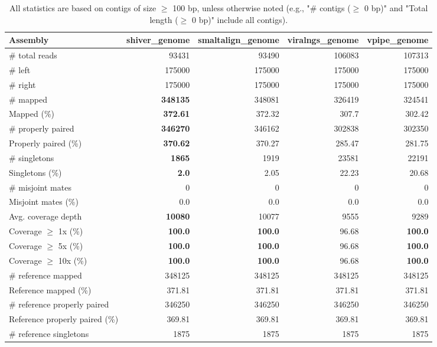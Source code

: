 \documentclass[12pt,a4paper]{article}
\begin{document}
\begin{table}[ht]
\begin{center}
\caption{All statistics are based on contigs of size $\geq$ 100 bp, unless otherwise noted (e.g., "\# contigs ($\geq$ 0 bp)" and "Total length ($\geq$ 0 bp)" include all contigs).}
\begin{tabular}{|l*{4}{|r}|}
\hline
Assembly & shiver\_genome & smaltalign\_genome & viralngs\_genome & vpipe\_genome \\ \hline
\# total reads & 93431 & 93490 & 106083 & 107313 \\ \hline
\# left & 175000 & 175000 & 175000 & 175000 \\ \hline
\# right & 175000 & 175000 & 175000 & 175000 \\ \hline
\# mapped & {\bf 348135} & 348081 & 326419 & 324541 \\ \hline
Mapped (\%) & {\bf 372.61} & 372.32 & 307.7 & 302.42 \\ \hline
\# properly paired & {\bf 346270} & 346162 & 302838 & 302350 \\ \hline
Properly paired (\%) & {\bf 370.62} & 370.27 & 285.47 & 281.75 \\ \hline
\# singletons & {\bf 1865} & 1919 & 23581 & 22191 \\ \hline
Singletons (\%) & {\bf 2.0} & 2.05 & 22.23 & 20.68 \\ \hline
\# misjoint mates & 0 & 0 & 0 & 0 \\ \hline
Misjoint mates (\%) & 0.0 & 0.0 & 0.0 & 0.0 \\ \hline
Avg. coverage depth & {\bf 10080} & 10077 & 9555 & 9289 \\ \hline
Coverage $\geq$ 1x (\%) & {\bf 100.0} & {\bf 100.0} & 96.68 & {\bf 100.0} \\ \hline
Coverage $\geq$ 5x (\%) & {\bf 100.0} & {\bf 100.0} & 96.68 & {\bf 100.0} \\ \hline
Coverage $\geq$ 10x (\%) & {\bf 100.0} & {\bf 100.0} & 96.68 & {\bf 100.0} \\ \hline
\# reference mapped & 348125 & 348125 & 348125 & 348125 \\ \hline
Reference mapped (\%) & 371.81 & 371.81 & 371.81 & 371.81 \\ \hline
\# reference properly paired & 346250 & 346250 & 346250 & 346250 \\ \hline
Reference properly paired (\%) & 369.81 & 369.81 & 369.81 & 369.81 \\ \hline
\# reference singletons & 1875 & 1875 & 1875 & 1875 \\ \hline

\end{tabular}
\end{center}
\end{table}
\end{document}
